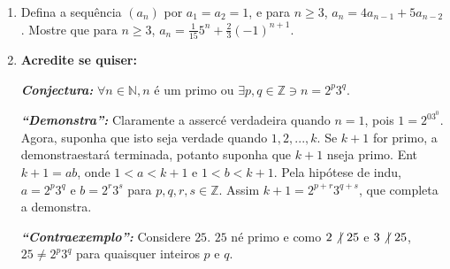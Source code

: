 \begin{enumerate}[{\bf 1.}]
\item Defina a sequ\^encia $(a_n)$ por $a_1=a_2=1$, e para $n\geq 3$, $a_n=4a_{n-1}+5a_{n-2}$. Mostre que para $n\geq 3$, $a_n=\frac{1}{15}5^n+\frac{2}{3}(-1)^{n+1}$.

\item {\bf Acredite se quiser:}  

\noindent \textit{\textbf{Conjectura:}} $\forall n\in\mathbb{N}, n$ \'e um primo ou $\exists p,q\in\mathbb{Z} \ni n=2^p3^q$. 

\noindent \textit{\textbf{``Demonstra\caoi'':}} Claramente a asserc\ao \'e verdadeira quando $n=1$, pois $1=2^03^0$. Agora, suponha que isto seja verdade quando $1,2,...,k$. Se $k+1$ for primo, a demonstra\cao estar\'a terminada, potanto suponha que $k+1$ n\ao seja primo. Ent\ao $k+1=ab$, onde $1<a<k+1$ e $1<b<k+1$. Pela hip\'otese de indu\caoi, $a=2^p3^q$ e $b=2^r3^s$ para $p,q,r,s\in\mathbb{Z}$. Assim $k+1=2^{p+r}3^{q+s}$, que completa a demonstra\caoi.

\noindent \textit{\textbf{``Contraexemplo'':}} Considere $25$. $25$ n\ao \'e primo e como $2\not|\textrm{ } 25$ e $3\not|\textrm{ } 25$, $25\neq 2^p3^q$ para quaisquer inteiros $p$ e $q$.
\end{enumerate}
